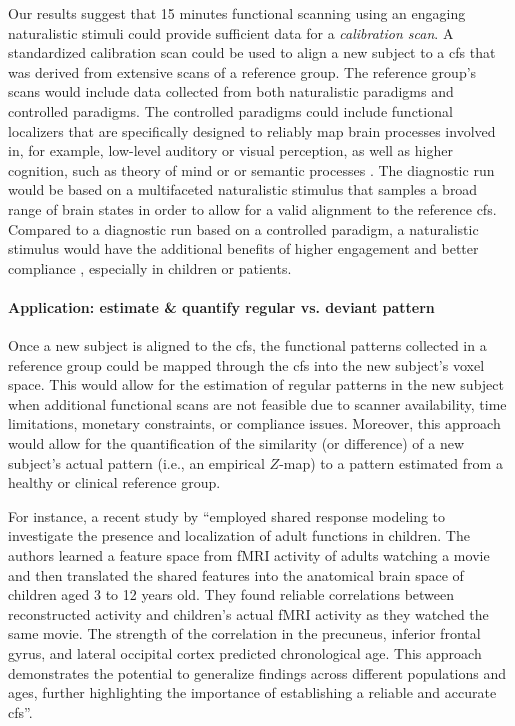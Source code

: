 %
Our results suggest that 15 minutes functional scanning using an engaging
naturalistic stimuli could provide sufficient data for a \textit{calibration
scan}.
%
A standardized calibration scan could be used to align a new subject to a
\ac{cfs} that was derived from extensive scans of a reference group.
%
The reference group's scans would include data collected from both naturalistic
paradigms and controlled paradigms.
%
The controlled paradigms could include functional localizers that are
specifically designed to reliably map brain processes involved in, for example,
low-level auditory or visual perception, as well as higher cognition, such as
theory of mind or \citep{spunt2014validating} or semantic processes
\citep{fedorenko2010new, fernandez2001language}.
%
The diagnostic run would be based on a multifaceted naturalistic stimulus that
samples a broad range of brain states in order to allow for a valid alignment to
the reference \ac{cfs}.
%
Compared to a diagnostic run based on a controlled paradigm, a naturalistic
stimulus would have the additional benefits of higher engagement and better
compliance \citep{vanderwal2015inscapes, eickhoff2020towards}, especially in
children or patients.


\paragraph{Application: estimate \& quantify regular vs. deviant pattern}

%
Once a new subject is aligned to the \ac{cfs}, the functional patterns collected
in a reference group could be mapped through the \ac{cfs} into the new subject's
voxel space.
%
This would allow for the estimation of regular patterns in the new subject when
additional functional scans are not feasible due to scanner availability, time
limitations, monetary constraints, or compliance issues.
%
Moreover, this approach would allow for the quantification of the similarity (or
difference) of a new subject's actual pattern (i.e., an empirical $Z$-map) to a
pattern estimated from a healthy or clinical reference group.


%
For instance, a recent study by \citet{yates2021emergence} ``employed shared
response modeling to investigate the presence and localization of adult
functions in children.
%
The authors learned a feature space from fMRI activity of adults watching a
movie and then translated the shared features into the anatomical brain space of
children aged 3 to 12 years old.
%
They found reliable correlations between reconstructed activity and children's
actual fMRI activity as they watched the same movie.
%
The strength of the correlation in the precuneus, inferior frontal gyrus, and
lateral occipital cortex predicted chronological age.
%
This approach demonstrates the potential to generalize findings across different
populations and ages, further highlighting the importance of establishing a
reliable and accurate \ac{cfs}''.



